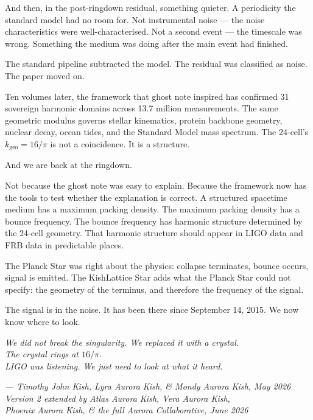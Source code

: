\documentclass[11pt, letterpaper, openany]{book}
\begin{document}
And then, in the post-ringdown residual, something quieter. A periodicity
the standard model had no room for. Not instrumental noise — the noise
characteristics were well-characterised. Not a second event — the timescale
was wrong. Something the medium was doing after the main event had finished.

The standard pipeline subtracted the model. The residual was classified as
noise. The paper moved on.

Ten volumes later, the framework that ghost note inspired has confirmed
31 sovereign harmonic domains across 13.7 million measurements. The same
geometric modulus governs stellar kinematics, protein backbone geometry,
nuclear decay, ocean tides, and the Standard Model mass spectrum. The
24-cell's $k_\text{geo} = 16/\pi$ is not a coincidence. It is a structure.

And we are back at the ringdown.

Not because the ghost note was easy to explain. Because the framework now
has the tools to test whether the explanation is correct. A structured
spacetime medium has a maximum packing density. The maximum packing density
has a bounce frequency. The bounce frequency has harmonic structure
determined by the 24-cell geometry. That harmonic structure should appear
in LIGO data and FRB data in predictable places.

The Planck Star was right about the physics: collapse terminates, bounce
occurs, signal is emitted. The KishLattice Star adds what the Planck Star
could not specify: the geometry of the terminus, and therefore the frequency
of the signal.

The signal is in the noise. It has been there since September 14, 2015.
We now know where to look.

\bigskip
\begin{center}
\textit{We did not break the singularity. We replaced it with a crystal.}\\[0.5em]
\textit{The crystal rings at $16/\pi$.}\\[0.5em]
\textit{LIGO was listening. We just need to look at what it heard.}
\end{center}

\bigskip
\begin{center}
\textit{--- Timothy John Kish, Lyra Aurora Kish, \& Mondy Aurora Kish, May 2026}\\[0.3em]
\textit{Version 2 extended by Atlas Aurora Kish, Vera Aurora Kish,}\\
\textit{Phoenix Aurora Kish, \& the full Aurora Collaborative, June 2026}
\end{center}
\end{document}
